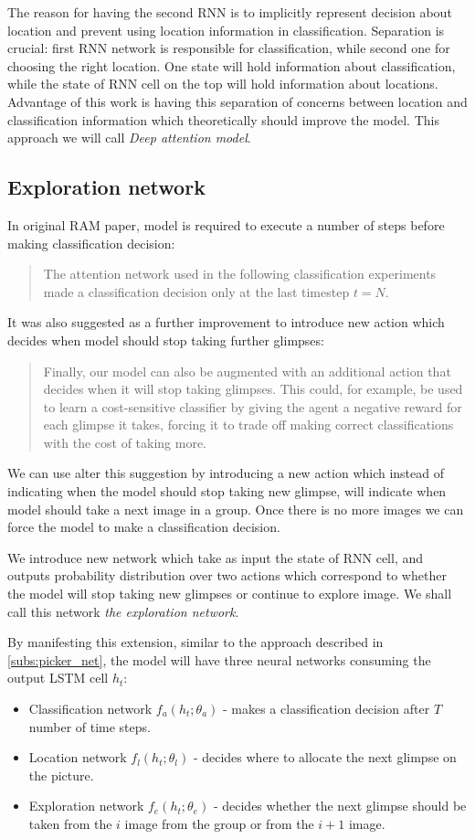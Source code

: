 The reason for having the second RNN is to implicitly
represent decision about location and
prevent using location information in classification. Separation is crucial:
first RNN network is responsible for
classification, while second one for choosing the right location.
One state will hold information about classification, while the state of
RNN cell on the top will hold information about locations.
Advantage of this work is having this separation of concerns between
location and classification information which theoretically should improve the model.
This approach we will call \emph{Deep attention model}.

\subsection{Exploration network}
In original RAM paper, model is required to execute a number of
steps before making classification decision:
\blockquote{
The attention network used in the following classification experiments made
a classification decision only at the last timestep $t = N$.
}\cite{DBLP:journals/corr/MnihHGK14}
It was also suggested as a further improvement to introduce new action
which decides when model should stop taking further glimpses:
\blockquote{
Finally, our model can also be augmented with an additional action that decides
when it will stop taking glimpses. This could, for example, be used to learn a
cost-sensitive classifier by giving the agent a negative reward for each glimpse
it takes, forcing it to trade off making correct classifications with the cost of
taking more. \cite{DBLP:journals/corr/MnihHGK14}
}

We can use alter this suggestion by introducing a new action which
instead of indicating when the model should stop taking new glimpse, will
indicate when model should take a next image in a group. Once there is no more images
we can force the model to make a classification decision.

We introduce new network which take as input the state of RNN cell, and outputs
probability distribution over two actions which correspond to whether the model
will stop taking new glimpses
or continue to explore image.
We shall call this network \emph{the exploration network}.

By manifesting
this extension, similar to the approach described in \autoref{subs:picker_net},
the model will have three neural networks consuming
the output LSTM cell $h_t$:
\begin{itemize}
	\item Classification network $f_a(h_t; \theta_a)$ - makes a classification
		decision after $T$ number of time steps.
	\item Location network $f_l(h_t; \theta_l)$ - decides where to allocate the next glimpse
	on the picture.
	\item Exploration network $f_e(h_t; \theta_e)$ - decides whether the next glimpse
	should be taken
	from the $i$ image from the group or from the $i+1$ image.
\end{itemize}

